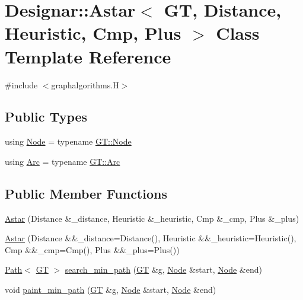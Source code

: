 \hypertarget{class_designar_1_1_astar}{}\section{Designar\+:\+:Astar$<$ GT, Distance, Heuristic, Cmp, Plus $>$ Class Template Reference}
\label{class_designar_1_1_astar}


{\ttfamily \#include $<$graphalgorithms.\+H$>$}

\subsection*{Public Types}
\begin{DoxyCompactItemize}
\item 
using \hyperlink{class_designar_1_1_astar_a0d4cdf6b94255824c6c93e5ae18e9eb7}{Node} = typename \hyperlink{class_designar_1_1_graph_a5dfc7dba9d092ac489c72e40390c37d0}{G\+T\+::\+Node}
\item 
using \hyperlink{class_designar_1_1_astar_a4d0b1c7cb0a71b5cfe3d21ea37c12108}{Arc} = typename \hyperlink{class_designar_1_1_graph_a74c730ef4ce2d20f998d72bd25c2b5bf}{G\+T\+::\+Arc}
\end{DoxyCompactItemize}
\subsection*{Public Member Functions}
\begin{DoxyCompactItemize}
\item 
\hyperlink{class_designar_1_1_astar_a9a684bbaa799da107f42ed8e048cac57}{Astar} (Distance \&\+\_\+distance, Heuristic \&\+\_\+heuristic, Cmp \&\+\_\+cmp, Plus \&\+\_\+plus)
\item 
\hyperlink{class_designar_1_1_astar_a5db848d589e8e4ce7582acc061cb8b17}{Astar} (Distance \&\&\+\_\+distance=Distance(), Heuristic \&\&\+\_\+heuristic=Heuristic(), Cmp \&\&\+\_\+cmp=Cmp(), Plus \&\&\+\_\+plus=Plus())
\item 
\hyperlink{class_designar_1_1_path}{Path}$<$ \hyperlink{demo-buildgraph_8_c_a3001c40d2c31ca87ed96cd7d1334a55e}{GT} $>$ \hyperlink{class_designar_1_1_astar_a23f41f4dd26aaef8ded7138de8866b54}{search\+\_\+min\+\_\+path} (\hyperlink{demo-buildgraph_8_c_a3001c40d2c31ca87ed96cd7d1334a55e}{GT} \&g, \hyperlink{class_designar_1_1_astar_a0d4cdf6b94255824c6c93e5ae18e9eb7}{Node} \&start, \hyperlink{class_designar_1_1_astar_a0d4cdf6b94255824c6c93e5ae18e9eb7}{Node} \&end)
\item 
void \hyperlink{class_designar_1_1_astar_ab6cf1a92f64a96290880a1483eac396f}{paint\+\_\+min\+\_\+path} (\hyperlink{demo-buildgraph_8_c_a3001c40d2c31ca87ed96cd7d1334a55e}{GT} \&g, \hyperlink{class_designar_1_1_astar_a0d4cdf6b94255824c6c93e5ae18e9eb7}{Node} \&start, \hyperlink{class_designar_1_1_astar_a0d4cdf6b94255824c6c93e5ae18e9eb7}{Node} \&end)
\end{DoxyCompactItemize}


